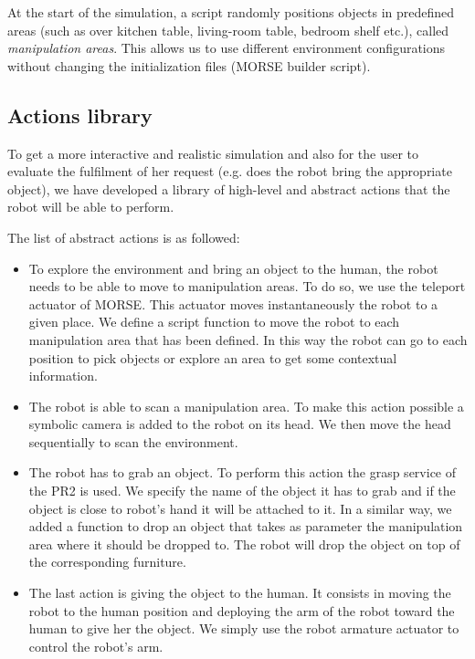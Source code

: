 \documentclass[a4paper,11pt,twoside]{StyleThese}
\begin{document}
At the start of the simulation, a script randomly positions objects in predefined areas
(such as over kitchen table, living-room table, bedroom shelf etc.), called \textit{manipulation areas}. This allows us to use different environment configurations without changing the initialization files (MORSE builder script).



\subsection{Actions library}
\label{section:actions}
To get a more interactive and realistic simulation and also for the user to
evaluate the fulfilment of her request (e.g. does the robot bring the appropriate object),
we have developed a library of high-level and abstract actions that the robot will be able to perform.

The list of abstract actions is as followed:
\begin{itemize}

\item To explore the environment and bring an object to the human, the robot needs to be able to move to manipulation areas. To do so, we use the teleport actuator of MORSE. This actuator moves instantaneously the robot to a given place. We define a script function to move the robot to each manipulation area that has been defined. In this way the robot can go to each position to pick objects or explore an area to get some contextual information.

\item The robot is able to scan a manipulation area. To make this action possible a symbolic camera is added to the robot on its head. We then move the head sequentially to scan the environment.

\item The robot has to grab an object. To perform this action the grasp service of the PR2 is used. We specify the name of the object it has to grab and if the object is close to robot's hand it will be attached to it. In a similar way, we added a function to drop an object that takes as parameter the manipulation area where it should be dropped to. The robot will drop the object on top of the corresponding furniture.

\item The last action is giving the object to the human. It consists in moving the robot to the human position and deploying the arm of the robot toward the human to give her the object. We simply use the robot armature actuator to control the robot's arm.
\end{itemize}
\end{document}
